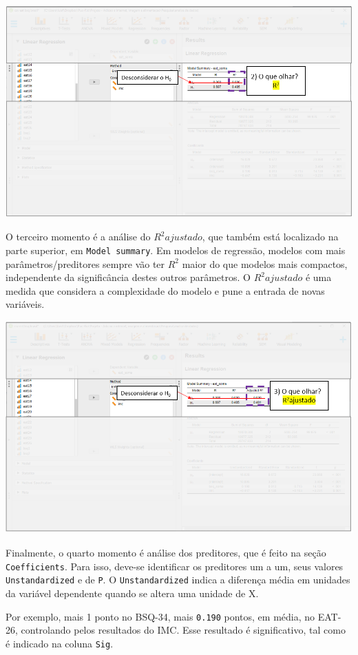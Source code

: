 \documentclass[
]{book}
\begin{document}
\includegraphics{./img/cap_reg_multipla_resultado_2.png}

O terceiro momento é a análise do \(R^2 ajustado\), que também está localizado na parte superior, em \texttt{Model\ summary}. Em modelos de regressão, modelos com mais parâmetros/preditores sempre vão ter \(R^2\) maior do que modelos mais compactos, independente da significância destes outros parâmetros. O \(R^2 ajustado\) é uma medida que considera a complexidade do modelo e pune a entrada de novas variáveis.

\includegraphics{./img/cap_reg_multipla_resultado_3.png}

Finalmente, o quarto momento é análise dos preditores, que é feito na seção \texttt{Coefficients}. Para isso, deve-se identificar os preditores um a um, seus valores \texttt{Unstandardized} e de \texttt{P}. O \texttt{Unstandardized} indica a diferença média em unidades da variável dependente quando se altera uma unidade de X.

Por exemplo, mais 1 ponto no BSQ-34, mais \texttt{0.190} pontos, em média, no EAT-26, controlando pelos resultados do IMC. Esse resultado é significativo, tal como é indicado na coluna \texttt{Sig}.
\end{document}
